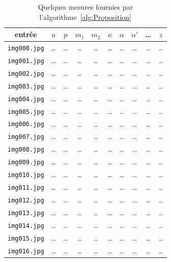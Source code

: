 \documentclass[11pt, french]{report-rd-info}
\begin{document}
\begin{table}
	\centering
	\begin{tabular}{|c||c|c|c|c|c|c|c|c|c|}
		\hline
		entrée & $a$ & $p$ & $m_1$ & $m_2$ & $\kappa$ & $\alpha$ & $\alpha'$ & \ldots & $z$ \\
		\hline
		\hline
		\texttt{img000.jpg} & \ldots & \ldots & \ldots & \ldots & \ldots & \ldots & \ldots & \ldots & \ldots\\
		\texttt{img001.jpg} & \ldots & \ldots & \ldots & \ldots & \ldots & \ldots & \ldots & \ldots & \ldots\\
		\texttt{img002.jpg} & \ldots & \ldots & \ldots & \ldots & \ldots & \ldots & \ldots & \ldots & \ldots\\
		\texttt{img003.jpg} & \ldots & \ldots & \ldots & \ldots & \ldots & \ldots & \ldots & \ldots & \ldots\\
		\texttt{img004.jpg} & \ldots & \ldots & \ldots & \ldots & \ldots & \ldots & \ldots & \ldots & \ldots\\
		\texttt{img005.jpg} & \ldots & \ldots & \ldots & \ldots & \ldots & \ldots & \ldots & \ldots & \ldots\\
		\texttt{img006.jpg} & \ldots & \ldots & \ldots & \ldots & \ldots & \ldots & \ldots & \ldots & \ldots\\
		\texttt{img007.jpg} & \ldots & \ldots & \ldots & \ldots & \ldots & \ldots & \ldots & \ldots & \ldots\\
		\texttt{img008.jpg} & \ldots & \ldots & \ldots & \ldots & \ldots & \ldots & \ldots & \ldots & \ldots\\
		\texttt{img009.jpg} & \ldots & \ldots & \ldots & \ldots & \ldots & \ldots & \ldots & \ldots & \ldots\\
		\texttt{img010.jpg} & \ldots & \ldots & \ldots & \ldots & \ldots & \ldots & \ldots & \ldots & \ldots\\
		\texttt{img011.jpg} & \ldots & \ldots & \ldots & \ldots & \ldots & \ldots & \ldots & \ldots & \ldots\\
		\texttt{img012.jpg} & \ldots & \ldots & \ldots & \ldots & \ldots & \ldots & \ldots & \ldots & \ldots\\
		\texttt{img013.jpg} & \ldots & \ldots & \ldots & \ldots & \ldots & \ldots & \ldots & \ldots & \ldots\\
		\texttt{img014.jpg} & \ldots & \ldots & \ldots & \ldots & \ldots & \ldots & \ldots & \ldots & \ldots\\
		\texttt{img015.jpg} & \ldots & \ldots & \ldots & \ldots & \ldots & \ldots & \ldots & \ldots & \ldots\\
		\texttt{img016.jpg} & \ldots & \ldots & \ldots & \ldots & \ldots & \ldots & \ldots & \ldots & \ldots\\
		\hline
	\end{tabular}
	\caption{Quelques mesures fournies par l'algorithme~\ref{alg:Proposition}}
	\label{tab:MesuresAlgorithme}
\end{table}
\end{document}
